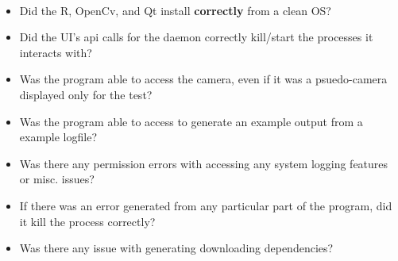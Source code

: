 \documentclass[12pt]{article}
\begin{document}
\\\begin{itemize}
  \\\item Did the R, OpenCv, and Qt install \textbf{correctly} from a clean OS?
  \\\item Did the UI's api calls for the daemon correctly kill/start the processes it interacts with?
  \\\item Was the program able to access the camera, even if it was a psuedo-camera displayed only for the test?
  \\\item Was the program able to access to generate an example output from a example logfile?
  \\\item Was there any permission errors with accessing any system logging features or misc. issues?
  \\\item If there was an error generated from any particular part of the program, did it kill the process correctly?
  \\\item Was there any issue with generating downloading dependencies? 
\end{itemize}
\pagebreak
\end{document}
